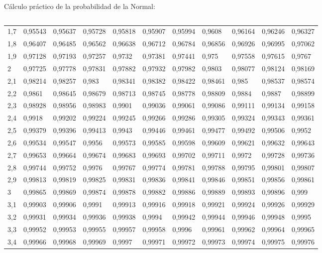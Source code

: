 \documentclass[11pt,handout]{beamer}
\begin{document}
\begin{frame}{Cálculo práctico de la probabilidad de la Normal:}
\begin{columns}
\begin{column}{0.4\textwidth}
{\begin{tabular}{l|llllllllll}
1,7 & 0,95543 & 0,95637 & 0,95728 & 0,95818 & 0,95907 & 0,95994 & 0,9608  & 0,96164 & 0,96246 & 0,96327 \\
1,8 & 0,96407 & 0,96485 & 0,96562 & 0,96638 & 0,96712 & 0,96784 & 0,96856 & 0,96926 & 0,96995 & 0,97062 \\
1,9 & 0,97128 & 0,97193 & 0,97257 & 0,9732  & 0,97381 & 0,97441 & 0,975   & 0,97558 & 0,97615 & 0,9767  \\
2   & 0,97725 & 0,97778 & 0,97831 & 0,97882 & 0,97932 & 0,97982 & 0,9803  & 0,98077 & 0,98124 & 0,98169 \\
2,1 & 0,98214 & 0,98257 & 0,983   & 0,98341 & 0,98382 & 0,98422 & 0,98461 & 0,985   & 0,98537 & 0,98574 \\
2,2 & 0,9861  & 0,98645 & 0,98679 & 0,98713 & 0,98745 & 0,98778 & 0,98809 & 0,9884  & 0,9887  & 0,98899 \\
2,3 & 0,98928 & 0,98956 & 0,98983 & 0,9901  & 0,99036 & 0,99061 & 0,99086 & 0,99111 & 0,99134 & 0,99158 \\
2,4 & 0,9918  & 0,99202 & 0,99224 & 0,99245 & 0,99266 & 0,99286 & 0,99305 & 0,99324 & 0,99343 & 0,99361 \\
2,5 & 0,99379 & 0,99396 & 0,99413 & 0,9943  & 0,99446 & 0,99461 & 0,99477 & 0,99492 & 0,99506 & 0,9952  \\
2,6 & 0,99534 & 0,99547 & 0,9956  & 0,99573 & 0,99585 & 0,99598 & 0,99609 & 0,99621 & 0,99632 & 0,99643 \\
2,7 & 0,99653 & 0,99664 & 0,99674 & 0,99683 & 0,99693 & 0,99702 & 0,99711 & 0,9972  & 0,99728 & 0,99736 \\
2,8 & 0,99744 & 0,99752 & 0,9976  & 0,99767 & 0,99774 & 0,99781 & 0,99788 & 0,99795 & 0,99801 & 0,99807 \\
2,9 & 0,99813 & 0,99819 & 0,99825 & 0,99831 & 0,99836 & 0,99841 & 0,99846 & 0,99851 & 0,99856 & 0,99861 \\
3   & 0,99865 & 0,99869 & 0,99874 & 0,99878 & 0,99882 & 0,99886 & 0,99889 & 0,99893 & 0,99896 & 0,999   \\
3,1 & 0,99903 & 0,99906 & 0,9991  & 0,99913 & 0,99916 & 0,99918 & 0,99921 & 0,99924 & 0,99926 & 0,99929 \\
3,2 & 0,99931 & 0,99934 & 0,99936 & 0,99938 & 0,9994  & 0,99942 & 0,99944 & 0,99946 & 0,99948 & 0,9995  \\
3,3 & 0,99952 & 0,99953 & 0,99955 & 0,99957 & 0,99958 & 0,9996  & 0,99961 & 0,99962 & 0,99964 & 0,99965 \\
3,4 & 0,99966 & 0,99968 & 0,99969 & 0,9997  & 0,99971 & 0,99972 & 0,99973 & 0,99974 & 0,99975 & 0,99976 \\

\end{tabular}}
\end{column}
\end{columns}
\end{frame}
\end{document}
